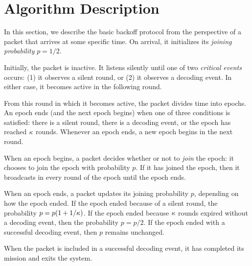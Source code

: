 \section{Algorithm Description}

In this section, we describe the basic backoff protocol from the perspective of a packet that arrives at some specific time.  On arrival, it initializes its \emph{joining probability} $p = 1/2$.

Initially, the packet is inactive.  It listens silently until one of two \emph{critical events} occurs: (1) it observes a silent round, or (2) it observes a decoding event.  In either case, it becomes active in the following round.

From this round in which it becomes active, the packet divides time into epochs.  An epoch ends (and the next epoch begins) when one of three conditions is satisfied: there is a silent round, there is a decoding event, or the epoch has reached $\kappa$ rounds.  Whenever an epoch ends, a new epoch begins in the next round.

When an epoch begins, a packet decides whether or not to \emph{join} the epoch: it chooses to join the epoch with probability $p$.  If it has joined the epoch, then it broadcasts in every round of the epoch until the epoch ends.

When an epoch ends, a packet updates its joining probability $p$, depending on how the epoch ended.  If the epoch ended because of a silent round, the probability $p = p(1 + 1/\kappa)$.  If the epoch ended because $\kappa$ rounds expired without a decoding event, then the probability $p = p/2$.  If the epoch ended with a successful decoding event, then $p$ remains unchanged.

When the packet is included in a successful decoding event, it has completed its mission and exits the system.

